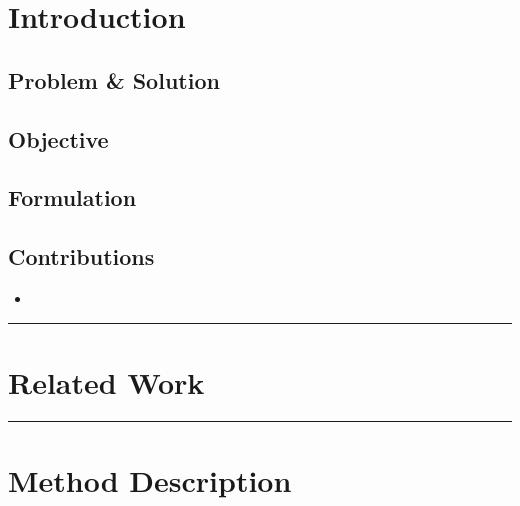\documentclass[letterpaper,10pt]{article}
\newcommand{\panhline}{\begin{center}\rule{\textwidth}{1pt}\end{center}}
\begin{document}
\section{Introduction}



\subsection{Problem \& Solution}





\subsection{Objective}





\subsection{Formulation}





\subsection{Contributions}

\begin{itemize}

	\item 

\end{itemize}



\panhline

\section{Related Work}





\panhline


\section{Method Description}
\end{document}

